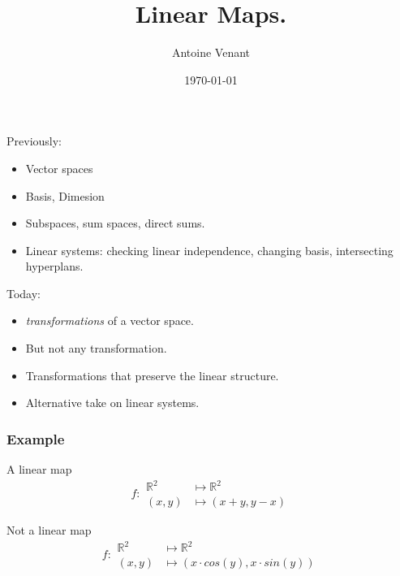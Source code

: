 \documentclass{beamer}
\newcommand{\hidden}[1]{}
\begin{document}
\title{Linear Maps.} 
\author{Antoine Venant}
\date{\today}
\maketitle


\begin{frame}{Previously:}
  \begin{itemize}
  \item Vector spaces
  \item Basis, Dimesion
  \item Subspaces, sum spaces, direct sums.
  \item Linear systems: checking linear independence, changing basis, intersecting hyperplans.
  \end{itemize}
\end{frame}

\begin{frame}{Today:}
  \begin{itemize}
  \item \emph{transformations} of a vector space.
  \item But not any transformation.
  \item Transformations that preserve the linear structure.
  \item Alternative take on linear systems.
  \end{itemize}
\end{frame}

\hidden{
\begin{exampleblock}{Example:}
  \begin{center}
            
    \end{center}
\end{exampleblock}
}

\begin{frame}
  \frametitle{Example}
  \begin{exampleblock}{A linear map}
    \[f: \begin{aligned} \mathbb{R}^2 &\mapsto \mathbb{R}^2\\ (x,y) &\mapsto (x + y, y - x) \end{aligned}\]  
  \end{exampleblock}

  \begin{exampleblock}{Not a linear map}
    \[f: \begin{aligned} \mathbb{R}^2 &\mapsto \mathbb{R}^2\\ (x,y) &\mapsto (x \cdot cos(y), x \cdot sin(y)) \end{aligned}\]  
  \end{exampleblock}
\end{frame}
\end{document}
